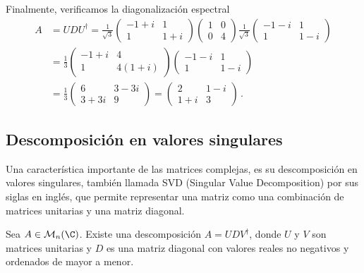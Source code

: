 \begin{eje}
  Finalmente, verificamos la diagonalización espectral
  \begin{align*}
    A & = U D U^\dagger = \frac{1}{\sqrt{3}}\begin{pmatrix} -1+i & 1   \\
                1    & 1+i\end{pmatrix}\begin{pmatrix} 1 & 0 \\ 0 & 4 \end{pmatrix}\frac{1}{\sqrt{3}}\begin{pmatrix} -1-i & 1   \\
                1    & 1-i\end{pmatrix} \\
      & = \frac{1}{3}\begin{pmatrix} -1+i & 4      \\
                1    & 4(1+i)\end{pmatrix}\begin{pmatrix} -1-i & 1   \\
                1    & 1-i\end{pmatrix}                                                                                   \\
      & = \frac{1}{3}\begin{pmatrix} 6    & 3-3i \\
                3+3i & 9\end{pmatrix} = \begin{pmatrix} 2 & 1-i \\ 1+i & 3 \end{pmatrix}\,.
  \end{align*}
\end{eje}

\subsection{Descomposición en valores singulares}

Una característica importante de las matrices complejas, es su descomposición en valores singulares, también llamada SVD (Singular Value Decomposition) por sus siglas en inglés, que permite representar una matriz como una combinación de matrices unitarias y una matriz diagonal.

\begin{prop}
  Sea $A \in \mathcal{M}_n(\C)$. Existe una descomposición $A = UDV^\dagger$, donde $U$ y $V$ son matrices unitarias y $D$ es una matriz diagonal con valores reales no negativos y ordenados de mayor a menor.
\end{prop}

